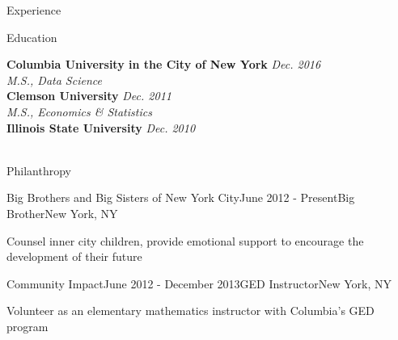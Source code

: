 \documentclass{resume} %
\begin{document}
\begin{rSection}{Experience}

\end{rSection}

\vspace{-0.4cm}
\begin{rSection}{Education}

{\bf Columbia University in the City of New York} \hfill {\em Dec. 2016} \\ 
{\em  M.S., Data Science} \\
{\bf Clemson University} \hfill {\em Dec. 2011} \\ 
{\em M.S., Economics \& Statistics} \\
{\bf Illinois State University} \hfill {\em Dec. 2010} \\ 
\indent {} \\
\end{rSection}

\vspace{-0.6cm}
\begin{rSection}{Philanthropy}
\begin{rSubsection}{Big Brothers and Big Sisters of New York City}{June 2012 - Present}{Big Brother}{New York, NY}
\item Counsel inner city children, provide emotional support to encourage the development of their future
\end{rSubsection}

\begin{rSubsection}{Community Impact}{June 2012 - December 2013}{GED Instructor}{New York, NY}
\item Volunteer as an elementary mathematics instructor with Columbia's GED program
\end{rSubsection}

\end{rSection}
\end{document}
